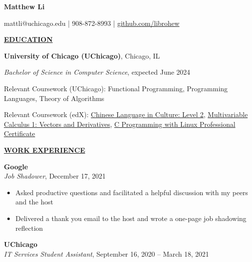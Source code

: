 \documentclass[
]{article}
\author{}
\date{\vspace{-2.5em}}
\providecommand{\tightlist}{%
  \setlength{\itemsep}{0pt}\setlength{\parskip}{0pt}}
\begin{document}

\begin{center}

\textbf{Matthew Li}

\end{center}

\begin{center}
mattli@uchicago.edu | 908-872-8993 | \href{https://www.github.com/librohew}{github.com/librohew}   
\end{center}

\textbf{\underline{EDUCATION}}

\textbf{University of Chicago (UChicago)}, Chicago, IL

\emph{Bachelor of Science in Computer Science}, expected June 2024


Relevant Coursework (UChicago): Functional Programming, %
Programming Languages, %
Theory of Algorithms

Relevant Coursework (edX): \href{https://courses.edx.org/certificates/dfd4b97d29cd408a985d6453a40d5424}{Chinese Language in Culture: Level 2}, %
\href{https://courses.edx.org/certificates/427a45b7df034c2a9fb085b0993bdec0}{Multivariable Calculus 1: Vectors and Derivatives}, \href{https://credentials.edx.org/credentials/1782d3571b2945de9b421230968ace62/}{C Programming with Linux Professional Certificate}

\textbf{\underline{WORK EXPERIENCE}}

\textbf{Google}\\
\emph{Job Shadower}, December 17, 2021

\begin{itemize}
\tightlist
\item
  Asked productive questions and facilitated a helpful discussion with my peers and the host
\end{itemize}

\begin{itemize}
\item
  Delivered a thank you email to the host and wrote a one-page job shadowing reflection  
\end{itemize}

\textbf{UChicago}\\
\emph{IT Services Student Assistant}, September 16, 2020 -- March 18,
2021
\end{document}
